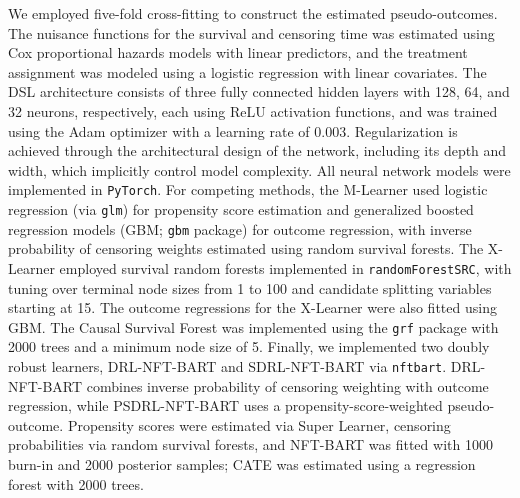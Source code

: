 \documentclass{article}
\begin{document}
We employed five-fold cross-fitting to construct the estimated pseudo-outcomes. The nuisance functions for the survival and censoring time was estimated using Cox proportional hazards models with linear predictors, and the treatment assignment was modeled using a logistic regression with linear covariates. {The DSL architecture consists of three fully connected hidden layers with 128, 64, and 32 neurons, respectively, each using ReLU activation functions}, and was trained using the Adam optimizer with a learning rate of 0.003. Regularization is achieved through the architectural design of the network, including its depth and width, which implicitly control model complexity. All neural network models were implemented in \texttt{PyTorch}. For competing methods, the M-Learner used logistic regression (via \texttt{glm}) for propensity score estimation and generalized boosted regression models (GBM; \texttt{gbm} package) for outcome regression, with inverse probability of censoring weights estimated using random survival forests. The X-Learner employed survival random forests implemented in \texttt{randomForestSRC}, with tuning over terminal node sizes from 1 to 100 and candidate splitting variables starting at 15. The outcome regressions for the X-Learner were also fitted using GBM. {The Causal Survival Forest was implemented using the \texttt{grf} package with 2000 trees and a minimum node size of 5.   Finally, we implemented two doubly robust learners, DRL-NFT-BART and SDRL-NFT-BART\citep{yang2025doubly} via \texttt{nftbart}.  DRL-NFT-BART combines inverse probability of censoring weighting with outcome regression, while PSDRL-NFT-BART uses a propensity-score-weighted pseudo-outcome. Propensity scores were estimated via Super Learner, censoring probabilities via random survival forests, and NFT-BART was fitted with 1000 burn-in and 2000 posterior samples; CATE was estimated using a regression forest with 2000 trees.}
\end{document}
